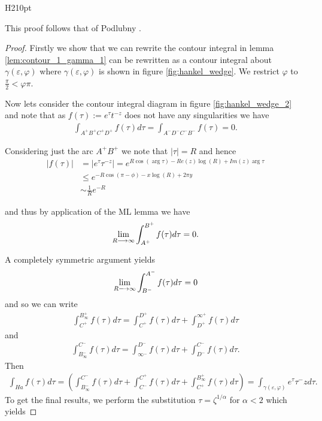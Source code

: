 \begin{wrapfigure}{H}{210pt}
    
    \caption{ Integration contour for $ \gamma(\varepsilon, \varphi) $}
    \label{fig:hankel_wedge_2}
\end{wrapfigure}
This proof follows that of Podlubny \cite{Podlubny1999}.
\begin{proof}

Firstly we show that we can rewrite the contour integral in lemma \ref{lem:contour_1_gamma_1} can be rewritten as a contour
integral about $ \gamma(\varepsilon, \varphi) $ where $ \gamma(\varepsilon, \varphi) $ is shown in figure \ref{fig:hankel_wedge}. We restrict $ \varphi $ to $ \frac{\pi}{2} < \varphi \pi $. 

Now lets consider the contour integral diagram in figure \ref{fig:hankel_wedge_2} and note that as $ f(\tau) := e^\tau t^{-z} $ does not have any singularities we have
\begin{align}
    \int_{A^+ B^+ C^+ D^+} f(\tau) d\tau = \int_{A^-D^-C^-B^-} f(\tau) = 0.
\end{align}

Considering just the arc $ A^+B^+ $ we note that $ |\tau| = R $ and hence
\begin{align}
    |f(\tau)| &= |e^\tau \tau^{-z}| = e^{R\cos(\arg \tau) - Re(z) \log(R) + Im(z) \arg \tau} \\
      &\leq e^{-R\cos(\pi - \phi) - x \log(R) + 2 \pi y} \\
      &\sim \frac{1}{R}e^{-R}
\end{align}

and thus by application of the ML lemma we have
\begin{align}
    \lim_{R \longrightarrow \infty} \int_{A^+}^{B^+} f(\tau) d\tau = 0.
\end{align}


A completely symmetric argument yields
\begin{align}
    \lim_{R \longrightarrow \infty} \int_{B^-}^{A^-} f(\tau) d\tau = 0
\end{align}
and so we can write
\begin{align}
    \int_{C^+}^{B_\infty^+} f(\tau)d\tau = \int_{C^+}^{D^+} f(\tau)d\tau + \int_{D^+}^{\infty^+} f(\tau)d\tau
\end{align}
and
\begin{align}
    \int_{B_\infty^-}^{C^-} f(\tau)d\tau = \int_{\infty^-}^{D^-} f(\tau)d\tau + \int_{D^-}^{C^-} f(\tau)d\tau.
\end{align}
Then
\begin{align}
    \int_{Ha} f(\tau) d\tau = \left( \int_{B_\infty^-}^{C^-} f(\tau)d\tau + \int_{C^-}^{C^+} f(\tau)d\tau +  \int_{C^+}^{B_\infty^+} f(\tau)d\tau \right) = \int_{\gamma(\varepsilon, \varphi)}e^\tau \tau^-z d\tau.
\end{align}
To get the final results, we perform the substitution $ \tau = \zeta^{1/\alpha} $ for $ \alpha < 2 $
which yields


\end{proof}
